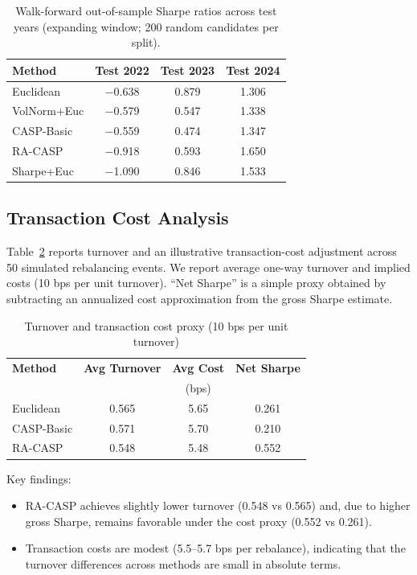\documentclass[10pt,twocolumn,a4paper]{article}
\begin{document}
\begin{table}[H]
\centering
\caption{Walk-forward out-of-sample Sharpe ratios across test years (expanding window; 200 random candidates per split).}
\label{tab:wf}
\small
\begin{tabular}{lccc}
\toprule
\textbf{Method} & \textbf{Test 2022} & \textbf{Test 2023} & \textbf{Test 2024} \\
\midrule
Euclidean & $-$0.638 & 0.879 & 1.306 \\
VolNorm+Euc & $-$0.579 & 0.547 & 1.338 \\
CASP-Basic & $-$0.559 & 0.474 & 1.347 \\
RA-CASP & $-$0.918 & 0.593 & 1.650 \\
Sharpe+Euc & $-$1.090 & 0.846 & 1.533 \\
\bottomrule
\end{tabular}
\end{table}

\subsection{Transaction Cost Analysis}

Table~\ref{tab:turnover} reports turnover and an illustrative transaction-cost adjustment across 50 simulated rebalancing events. We report average one-way turnover and implied costs (10 bps per unit turnover). ``Net Sharpe'' is a simple proxy obtained by subtracting an annualized cost approximation from the gross Sharpe estimate.

\begin{table}[H]
\centering
\caption{Turnover and transaction cost proxy (10 bps per unit turnover)}
\label{tab:turnover}
\small
\begin{tabular}{lccc}
\toprule
\textbf{Method} & \textbf{Avg Turnover} & \textbf{Avg Cost} & \textbf{Net Sharpe} \\
 & & (bps) & \\
\midrule
Euclidean & 0.565 & 5.65 & 0.261 \\
CASP-Basic & 0.571 & 5.70 & 0.210 \\
RA-CASP & 0.548 & 5.48 & 0.552 \\
\bottomrule
\end{tabular}
\end{table}

Key findings: 
\begin{itemize}
    \item RA-CASP achieves slightly lower turnover (0.548 vs 0.565) and, due to higher gross Sharpe, remains favorable under the cost proxy (0.552 vs 0.261).
    \item Transaction costs are modest (5.5--5.7 bps per rebalance), indicating that the turnover differences across methods are small in absolute terms.
\end{itemize}
\end{document}
